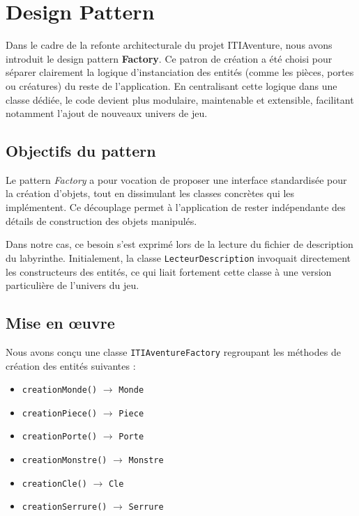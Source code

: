 \chapter{Design Pattern}

Dans le cadre de la refonte architecturale du projet ITIAventure, nous avons introduit le design pattern \textbf{Factory}. Ce patron de création a été choisi pour séparer clairement la logique d’instanciation des entités (comme les pièces, portes ou créatures) du reste de l’application. En centralisant cette logique dans une classe dédiée, le code devient plus modulaire, maintenable et extensible, facilitant notamment l’ajout de nouveaux univers de jeu.

\section{Objectifs du pattern}

Le pattern \textit{Factory} a pour vocation de proposer une interface standardisée pour la création d’objets, tout en dissimulant les classes concrètes qui les implémentent. Ce découplage permet à l’application de rester indépendante des détails de construction des objets manipulés.

Dans notre cas, ce besoin s’est exprimé lors de la lecture du fichier de description du labyrinthe. Initialement, la classe \texttt{LecteurDescription} invoquait directement les constructeurs des entités, ce qui liait fortement cette classe à une version particulière de l’univers du jeu.

\section{Mise en œuvre}

Nous avons conçu une classe \texttt{ITIAventureFactory} regroupant les méthodes de création des entités suivantes :
\begin{itemize}
  \item \texttt{creationMonde()} $\rightarrow$ \texttt{Monde}
  \item \texttt{creationPiece()} $\rightarrow$ \texttt{Piece}
  \item \texttt{creationPorte()} $\rightarrow$ \texttt{Porte}
  \item \texttt{creationMonstre()} $\rightarrow$ \texttt{Monstre}
  \item \texttt{creationCle()} $\rightarrow$ \texttt{Cle}
  \item \texttt{creationSerrure()} $\rightarrow$ \texttt{Serrure}
\end{itemize}

